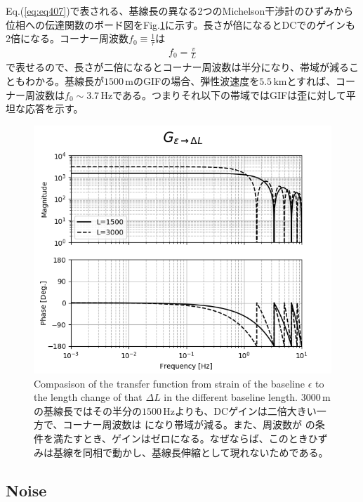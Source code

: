 Eq.(\ref{eq:eq407})で表される、基線長の異なる2つのMichelson干渉計のひずみから位相への伝達関数のボード図をFig.\ref{img:img411_a}に示す。長さが倍になるとDCでのゲインも2倍になる。コーナー周波数$f_0\equiv \frac{1}{\tau}$は
\begin{eqnarray}
  f_0 = \frac{v}{L}
\end{eqnarray}
で表せるので、長さが二倍になるとコーナー周波数は半分になり、帯域が減ることもわかる。基線長が$1500\,\mathrm{m}$のGIFの場合、弾性波速度を$5.5\,\mathrm{km}$とすれば、コーナー周波数は$f_0\sim3.7\,\mathrm{Hz}$である。つまりそれ以下の帯域ではGIFは歪に対して平坦な応答を示す。

\begin{figure}[p]
  \begin{center}
    \includegraphics[width=13.0cm]{./img_chap4/img412.png}
    \caption{Compasison of the transfer function from strain of the baseline $\epsilon$ to the length change of that $\Delta{L}$ in the different baseline length. $3000\,\mathrm{m}$ の基線長ではその半分の$1500\,\mathrm{Hz}$よりも、DCゲインは二倍大きい一方で、コーナー周波数は \color{red}{A} になり帯域が減る。また、周波数が \color{red}{B} の条件を満たすとき、ゲインはゼロになる。なぜならば、このときひずみは基線を同相で動かし、基線長伸縮として現れないためである。}\label{img:img411_a}
  \end{center}
\end{figure}

\subsection{Noise}
